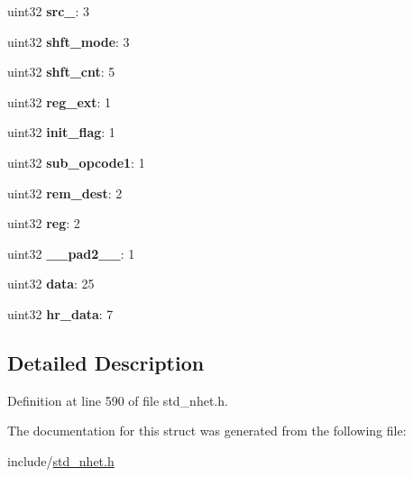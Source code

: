 \begin{DoxyCompactItemize}
\mbox{\label{structSBB__format_afdcd9cacebd184b370c239b838d129dd}} 
uint32 {\bfseries src\+\_}\+: 3
\item 
\mbox{\label{structSBB__format_aa3c8cd680cbfcde440830397c8beacab}} 
uint32 {\bfseries shft\+\_\+mode}\+: 3
\item 
\mbox{\label{structSBB__format_ac6175d582e2d2c2041771472c0dbb944}} 
uint32 {\bfseries shft\+\_\+cnt}\+: 5
\item 
\mbox{\label{structSBB__format_a006f1c587e70238260a8020941304f31}} 
uint32 {\bfseries reg\+\_\+ext}\+: 1
\item 
\mbox{\label{structSBB__format_aef1840f3384b8bd5e81c4ba5839edc6d}} 
uint32 {\bfseries init\+\_\+flag}\+: 1
\item 
\mbox{\label{structSBB__format_affba47127314f4a6f7abb06df9f8efca}} 
uint32 {\bfseries sub\+\_\+opcode1}\+: 1
\item 
\mbox{\label{structSBB__format_a6ccb39f6211d689d1cfcd5a52219295a}} 
uint32 {\bfseries rem\+\_\+dest}\+: 2
\item 
\mbox{\label{structSBB__format_a9f2044f8361ab45a3525ee8477324a94}} 
uint32 {\bfseries reg}\+: 2
\item 
\mbox{\label{structSBB__format_af49bfc098338ff67239de4e58e8d718e}} 
uint32 {\bfseries \+\_\+\+\_\+pad2\+\_\+\+\_\+}\+: 1
\item 
\mbox{\label{structSBB__format_ae8bf659e29dc177817b7870fbcd448af}} 
uint32 {\bfseries data}\+: 25
\item 
\mbox{\label{structSBB__format_ae79a18a83cac0a15df24b99ed8d8a8a0}} 
uint32 {\bfseries hr\+\_\+data}\+: 7
\end{DoxyCompactItemize}


\subsection{Detailed Description}


Definition at line 590 of file std\+\_\+nhet.\+h.



The documentation for this struct was generated from the following file\+:\begin{DoxyCompactItemize}
\item 
include/\mbox{\hyperlink{std__nhet_8h}{std\+\_\+nhet.\+h}}\end{DoxyCompactItemize}
